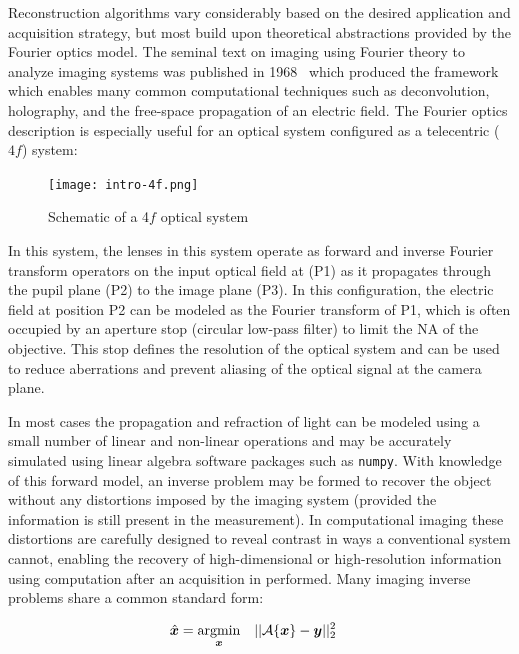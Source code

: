 Reconstruction algorithms vary considerably based on the desired application and acquisition strategy, but most build upon theoretical abstractions provided by the Fourier optics model. The seminal text on imaging using Fourier theory to analyze imaging systems was published in 1968~\cite{goodman:68} which produced the framework which enables many common computational techniques such as deconvolution, holography, and the free-space propagation of an electric field. The Fourier optics description is especially useful for an optical system configured as a telecentric ($4f$) system:

\begin{figure}[tbh]
\centering
\texttt{[image: intro-4f.png]}
\caption{\label{fig:4f} Schematic of a 4$f$ optical system}
\end{figure}

\noindent In this system, the lenses in this system operate as forward and inverse Fourier transform operators on the input optical field at (P1) as it propagates through the pupil plane (P2) to the image plane (P3). In this configuration, the electric field at position P2 can be modeled as the Fourier transform of P1, which is often occupied by an aperture stop (circular low-pass filter) to limit the NA of the objective. This stop defines the resolution of the optical system and can be used to reduce aberrations and prevent aliasing of the optical signal at the camera plane.

In most cases the propagation and refraction of light can be modeled using a small number of linear and non-linear operations and may be accurately simulated using linear algebra software packages such as \texttt{numpy}. With knowledge of this forward model, an inverse problem may be formed to recover the object without any distortions imposed by the imaging system (provided the information is still present in the measurement). In computational imaging these distortions are carefully designed to reveal contrast in ways a conventional system cannot, enabling the recovery of high-dimensional or high-resolution information using computation after an acquisition in performed. Many imaging inverse problems share a common standard form:

\begin{equation}\label{eq:intro_inverse_problem}
\begin{aligned}
& \hat{\bm{x}} = \underset{\bm{\bm{x}}}{\text{argmin}}
& & ||\mathcal{A}\{\bm{x}\} - \bm{y} ||_2^2
\end{aligned}
\end{equation}

